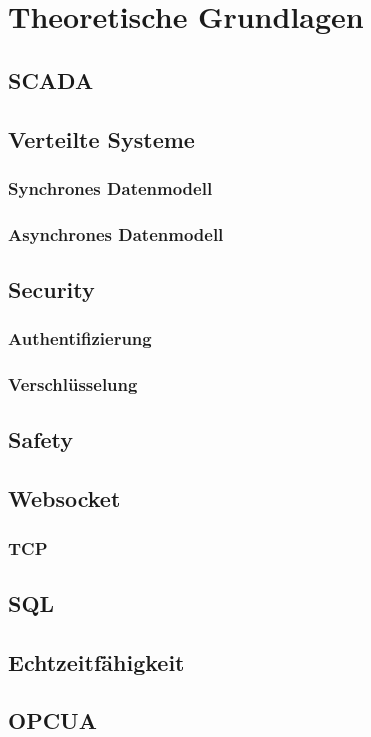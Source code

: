 \chapter{Theoretische Grundlagen}
\section{SCADA}
\section{Verteilte Systeme}
\subsection{Synchrones Datenmodell}
\subsection{Asynchrones Datenmodell}
\section{Security}
\subsection{Authentifizierung}
\subsection{Verschlüsselung}
\section{Safety}
\section{Websocket}
\subsection{TCP}
\section{SQL}
\section{Echtzeitfähigkeit}
\section{OPCUA}